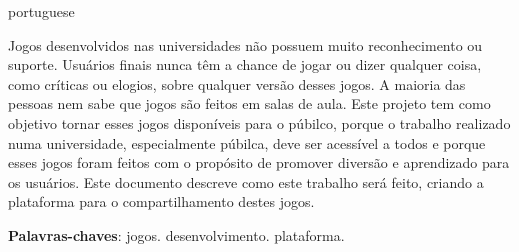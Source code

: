 \begin{resumo}[Resumo]
 \begin{otherlanguage*}{portuguese}

Jogos desenvolvidos nas universidades não possuem muito reconhecimento ou suporte. Usuários finais nunca têm a chance de jogar ou dizer qualquer coisa, como críticas ou elogios, sobre qualquer versão desses jogos. A maioria das pessoas nem sabe que jogos são feitos em salas de aula. Este projeto tem como objetivo tornar esses jogos disponíveis para o púbilco, porque o trabalho realizado numa universidade, especialmente púbilca, deve ser acessível a todos e porque esses jogos foram feitos com o propósito de promover diversão e aprendizado para os usuários. Este documento descreve como este trabalho será feito, criando a plataforma para o compartilhamento destes jogos.

 \vspace{\onelineskip}

 \noindent
 \textbf{Palavras-chaves}: jogos. desenvolvimento. plataforma.
 \end{otherlanguage*}
\end{resumo}

